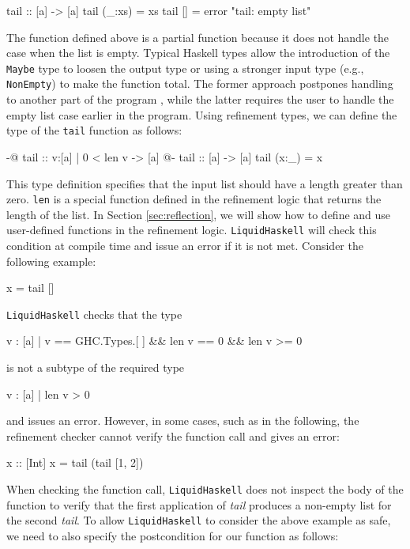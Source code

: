 \documentclass[]{rptuseminar}
\begin{document}
\begin{haskell}
 tail :: [a] -> [a]
 tail (_:xs) = xs
 tail [] = error "tail: empty list"
\end{haskell}

The function defined above is a partial function because it does not handle the case when the list is empty. 
Typical Haskell types allow the introduction of the \texttt{Maybe} type to loosen the output type or using a stronger input type (e.g., \texttt{NonEmpty}) to make the function total.  
The former approach postpones handling to another part of the program \cite{jhala_programming_2020}, while the latter requires the user to handle the empty list case earlier in the program.
Using refinement types, we can define the type of the \texttt{tail} function as follows:

\begin{haskell}
{-@ tail :: {v:[a] | 0 < len v} -> [a] @-}
 tail :: [a] -> [a]
 tail (x:_) = x
\end{haskell}

This type definition specifies that the input list should have a length greater than zero.
\texttt{len} is a special function defined in the refinement logic that returns the length of the list.
In Section \ref{sec:reflection}, we will show how to define and use user-defined functions in the refinement logic.
\texttt{LiquidHaskell} will check this condition at compile time and issue an error if it is not met.
Consider the following example:
\begin{haskell}
x = tail []
\end{haskell}
\texttt{LiquidHaskell} checks that the type 
\begin{haskell}
{v : [a] | v == GHC.Types.[ ] && len v == 0 && len v >= 0}
\end{haskell}
is not a subtype of the required type 

\begin{haskell}
{v : [a] | len v > 0}
\end{haskell}
and issues an error. However, in some cases, such as in the following, the refinement checker cannot verify the function call and gives an error:
\begin{haskell}
 x :: [Int]
 x = tail (tail [1, 2])
\end{haskell}

When checking the function call, \texttt{LiquidHaskell} does not inspect the body of the function to verify that the first application 
of \textit{tail} produces a non-empty list for the second \textit{tail}.
To allow \texttt{LiquidHaskell} to consider the above example as safe, we need to also specify the postcondition for our function as follows:
\end{document}
